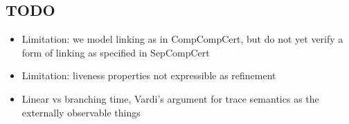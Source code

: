 \documentclass[acmsmall,timestamp,review,anonymous]{acmart}
\begin{document}


\subsection{TODO}

\begin{itemize}
\item
  Limitation:
  we model linking as in CompCompCert,
  but do not yet verify a form of linking as specified in SepCompCert
\item
  Limitation:
  liveness properties not expressible as refinement
\item
  Linear vs branching time,
  Vardi's argument for trace semantics
  as the externally observable things
\end{itemize}




\end{document}
